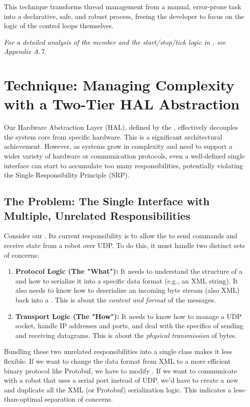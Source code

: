 This technique transforms thread management from a manual, error-prone task into a declarative, safe, and robust process, freeing the developer to focus on the logic of the control loops themselves.

\textit{For a detailed analysis of the  member and the start/stop/tick logic in , see Appendix A.7.}



\section{Technique: Managing Complexity with a Two-Tier HAL Abstraction}
\label{sec:two_tier_hal_conceptual}

Our Hardware Abstraction Layer (HAL), defined by the , effectively decouples the system core from specific hardware. This is a significant architectural achievement. However, as systems grow in complexity and need to support a wider variety of hardware or communication protocols, even a well-defined single interface can start to accumulate too many responsibilities, potentially violating the Single Responsibility Principle (SRP).

\subsection{The Problem: The Single Interface with Multiple, Unrelated Responsibilities}
\label{subsec:hal_srp_violation_conceptual}

Consider our . Its current responsibility is to allow the  to send commands and receive state from a robot over UDP. To do this, it must handle two distinct sets of concerns:
\begin{enumerate}
    \item \textbf{Protocol Logic (The "What"):} It needs to understand the structure of a  and how to serialize it into a specific data format (e.g., an XML string). It also needs to know how to deserialize an incoming byte stream (also XML) back into a . This is about the \textit{content and format} of the messages.
    \item \textbf{Transport Logic (The "How"):} It needs to know how to manage a UDP socket, handle IP addresses and ports, and deal with the specifics of sending and receiving datagrams. This is about the \textit{physical transmission} of bytes.
\end{enumerate}
Bundling these two unrelated responsibilities into a single class makes it less flexible. If we want to change the data format from XML to a more efficient binary protocol like Protobuf, we have to modify . If we want to communicate with a robot that uses a serial port instead of UDP, we'd have to create a new  and duplicate all the XML (or Protobuf) serialization logic. This indicates a less-than-optimal separation of concerns.

